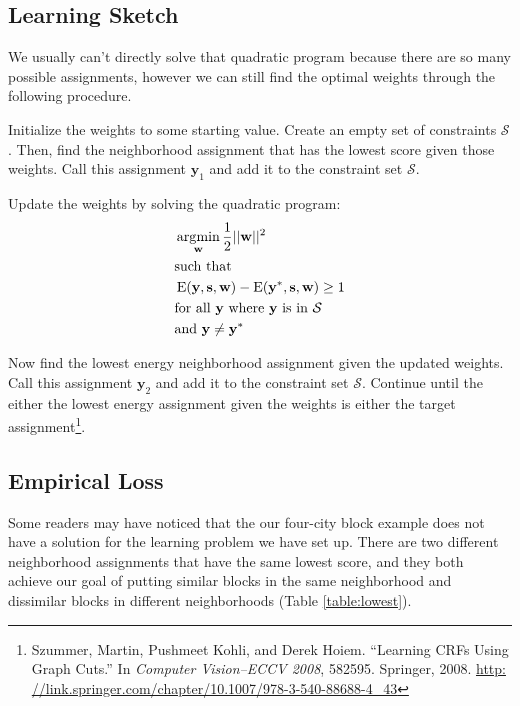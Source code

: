 \subsection*{Learning Sketch}
We usually can't directly solve that quadratic program because there
are so many possible assignments, however we can still find the
optimal weights through the following procedure.

Initialize the weights to some starting value. Create an empty set of
constraints $\mathcal{S}$. Then, find the neighborhood assignment that
has the lowest score given those weights. Call this assignment
$\mathbf{y}_1$ and add it to the constraint set $\mathcal{S}$.

Update the weights by solving the quadratic program: 
%
\begin{align*}
&\operatorname*{\arg\!\min}_{\mathbf{w}} \frac{1}{2}||\mathbf{w}||^2 \\
&\text{such that} \\
&\operatorname{E}(\mathbf{y}, \mathbf{s}, \mathbf{w})
- \operatorname{E}(\mathbf{y}^*, \mathbf{s}, \mathbf{w}) \geq 1 \\ 
&\text{for all } \mathbf{y} \text{ where } \mathbf{y} \text{ is in } \mathcal{S}\\
&\text{and } \mathbf{y} \neq \mathbf{y}^*
\end{align*}
%

Now find the lowest energy neighborhood assignment given the updated
weights. Call this assignment $\mathbf{y}_2$ and add it to the
constraint set $\mathcal{S}$. Continue until the either the lowest
energy assignment given the weights is either the target
assignment\footnote{Szummer, Martin, Pushmeet Kohli, and Derek
  Hoiem. ``Learning CRFs Using Graph Cuts.'' In \emph{Computer
    Vision–ECCV 2008}, 582595. Springer, 2008. \url{http:
 //link.springer.com/chapter/10.1007/978-3-540-88688-4_43}}.


\subsection*{Empirical Loss}
Some readers may have noticed that the our four-city block example
does not have a solution for the learning problem we have set up. There
are two different neighborhood assignments that have the same lowest
score, and they both achieve our goal of putting similar blocks in the 
same neighborhood and dissimilar blocks in different neighborhoods (Table \ref{table:lowest}).


